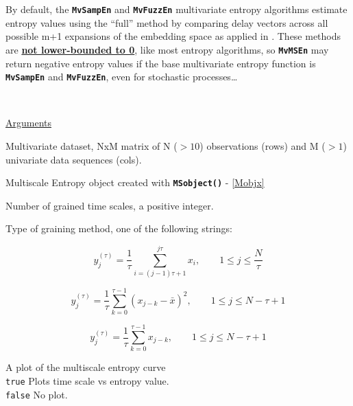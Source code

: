\documentclass[12pt, a4paper, titlepage, openany]{book}
\begin{document}
\begin{tcolorbox}[colback=ehone!5, colframe=ehtwo!, title=\hypertarget{bidinote}{\textbf{ATTENTION}}, label={BiBox}]
By default, the \texttt{\textbf{MvSampEn}} and \texttt{\textbf{MvFuzzEn}} multivariate entropy algorithms estimate entropy values using the “full” method by comparing delay vectors across all possible m+1 expansions of the embedding space as applied in \cite{MvSamp1} \cite{MvSamp2} \cite{MvFuzz1}. These methods are \ul{\textbf{not lower-bounded to 0}}, like most entropy algorithms, so \texttt{\textbf{MvMSEn}} may return negative entropy values if the base multivariate entropy function is \texttt{\textbf{MvSampEn}} and \texttt{\textbf{MvFuzzEn}}, even for stochastic processes…
\end{tcolorbox}
\ \newline

\noindent \ul{Arguments}
\begin{description}[labelsep=1cm, labelwidth=2cm, nosep, style=multiline,leftmargin=3cm]\footnotesize
\item[\texttt{Data}]	Multivariate dataset, NxM matrix of N ($>10$) observations (rows) and M ($> 1$) univariate data sequences (cols).
\item[\texttt{Mobj}]	Multiscale Entropy object created with \texttt{\textbf{MSobject()}} - \ref{Mobjx}
\item[\texttt{Scales}]		Number of grained time scales, a positive integer.
\item[\texttt{Methodx}]		Type of graining method, one of the following strings:
	\begin{description}[labelsep=8em, labelwidth=10em, nosep,style=multiline,leftmargin=3cm]
	\item[\texttt{"coarse"}]	\cite{MS1}
	\[y^{(\tau)}_{j} = \frac{1}{\tau} \sum^{j\tau}_{i=(j-1)\tau+1} x_{i},\qquad  1\leq j\leq \frac{N}{\tau}\] 
	
	\item[\texttt{"generalized"}]	\cite{MS12}
	\[y^{(\tau)}_{j} = \frac{1}{\tau} \sum^{\tau-1}_{k=0} (x_{j-k} - \bar{x})^2,	\qquad  1\leq j\leq N-\tau+1 \]	
	
	\item[\texttt{"modified"}]	
	\[y^{(\tau)}_{j} = \frac{1}{\tau} \sum^{\tau-1}_{k=0} x_{j-k},	\qquad  1\leq j\leq N-\tau+1 \]		
	\end{description}
\item[\texttt{Plotx}]		A plot of the multiscale entropy curve\\
							\texttt{true} \hspace{15pt} Plots time scale vs entropy value.\\
							\texttt{false}\hspace{12pt} No plot.\\ \ \\
\end{description}
\end{document}
